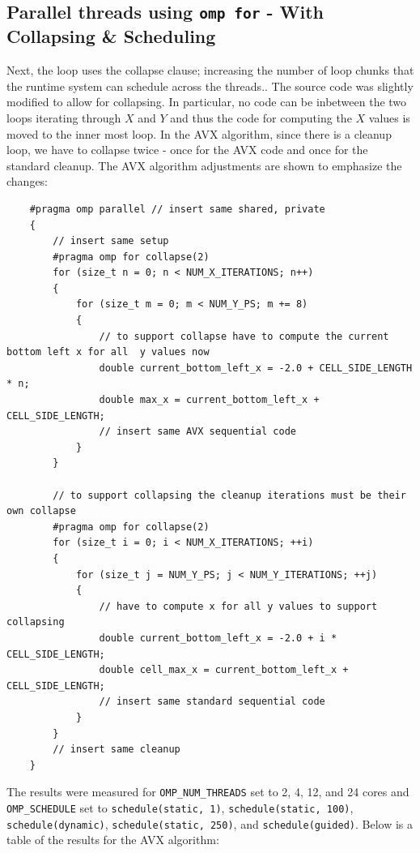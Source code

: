 \documentclass{article}
\begin{document}
\subsection{Parallel threads using \texttt{omp for} - With Collapsing \& Scheduling}
Next, the loop uses the collapse clause; increasing the number of loop chunks that
the runtime system can schedule across the threads.. The source code was slightly 
modified to allow for collapsing. In particular, no code can be inbetween the two loops 
iterating through $X$ and $Y$ and thus the code for computing the $X$ values is moved to the 
inner most loop. In the AVX algorithm, since there is a cleanup loop, we have to collapse twice - once for the AVX code and once for the standard cleanup.
The AVX algorithm adjustments are shown to emphasize the changes:
\newpage
\begin{lstlisting}
    #pragma omp parallel // insert same shared, private
    {
        // insert same setup
        #pragma omp for collapse(2)
        for (size_t n = 0; n < NUM_X_ITERATIONS; n++)
        {
            for (size_t m = 0; m < NUM_Y_PS; m += 8)
            {
                // to support collapse have to compute the current bottom left x for all  y values now
                double current_bottom_left_x = -2.0 + CELL_SIDE_LENGTH * n;
                double max_x = current_bottom_left_x + CELL_SIDE_LENGTH;
                // insert same AVX sequential code
            }
        }

        // to support collapsing the cleanup iterations must be their own collapse
        #pragma omp for collapse(2)
        for (size_t i = 0; i < NUM_X_ITERATIONS; ++i)
        {
            for (size_t j = NUM_Y_PS; j < NUM_Y_ITERATIONS; ++j)
            {
                // have to compute x for all y values to support collapsing
                double current_bottom_left_x = -2.0 + i * CELL_SIDE_LENGTH;
                double cell_max_x = current_bottom_left_x + CELL_SIDE_LENGTH;
                // insert same standard sequential code
            }
        }
        // insert same cleanup
    }
\end{lstlisting}
The results were measured for \texttt{OMP\_NUM\_THREADS} set to 2, 4, 12, and 24 cores and \texttt{OMP\_SCHEDULE} set to
\texttt{schedule(static, 1)}, \texttt{schedule(static, 100)}, \texttt{schedule(dynamic)}, \texttt{schedule(static, 250)}, and \texttt{schedule(guided)}. Below 
is a table of the results for the AVX algorithm:
\end{document}
